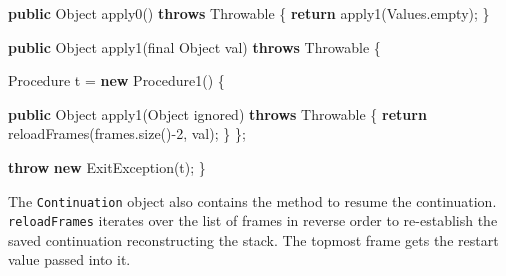 \documentclass[12pt,a4paper,oneside,openright]{book}
\newenvironment{Shaded}{\begin{snugshade}}{\end{snugshade}}
\newcommand{\KeywordTok}[1]{\textcolor[rgb]{0.13,0.29,0.53}{\textbf{{#1}}}}
\newcommand{\DataTypeTok}[1]{\textcolor[rgb]{0.13,0.29,0.53}{{#1}}}
\newcommand{\DecValTok}[1]{\textcolor[rgb]{0.00,0.00,0.81}{{#1}}}
\newcommand{\FunctionTok}[1]{\textcolor[rgb]{0.00,0.00,0.00}{{#1}}}
\newcommand{\NormalTok}[1]{{#1}}
\begin{document}
\begin{Shaded}
\begin{Highlighting}[]
    \KeywordTok{public} \NormalTok{Object }\FunctionTok{apply0}\NormalTok{() }\KeywordTok{throws} \NormalTok{Throwable \{}
        \KeywordTok{return} \FunctionTok{apply1}\NormalTok{(Values.}\FunctionTok{empty}\NormalTok{);}
    \NormalTok{\}}

    \KeywordTok{public} \NormalTok{Object }\FunctionTok{apply1}\NormalTok{(}\DataTypeTok{final} \NormalTok{Object val) }\KeywordTok{throws} \NormalTok{Throwable \{}

        \NormalTok{Procedure t = }\KeywordTok{new} \FunctionTok{Procedure1}\NormalTok{() \{}

            \KeywordTok{public} \NormalTok{Object }\FunctionTok{apply1}\NormalTok{(Object ignored) }\KeywordTok{throws} \NormalTok{Throwable \{}
                \KeywordTok{return} \FunctionTok{reloadFrames}\NormalTok{(frames.}\FunctionTok{size}\NormalTok{()-}\DecValTok{2}\NormalTok{, val);}
            \NormalTok{\}}
        \NormalTok{\};}

        \KeywordTok{throw} \KeywordTok{new} \FunctionTok{ExitException}\NormalTok{(t);}
    \NormalTok{\}}
\end{Highlighting}
\end{Shaded}

The \texttt{Continuation} object also contains the method to resume the
continuation. \texttt{reloadFrames} iterates over the list of frames in
reverse order to re-establish the saved continuation reconstructing the
stack. The topmost frame gets the restart value passed into it.
\end{document}
